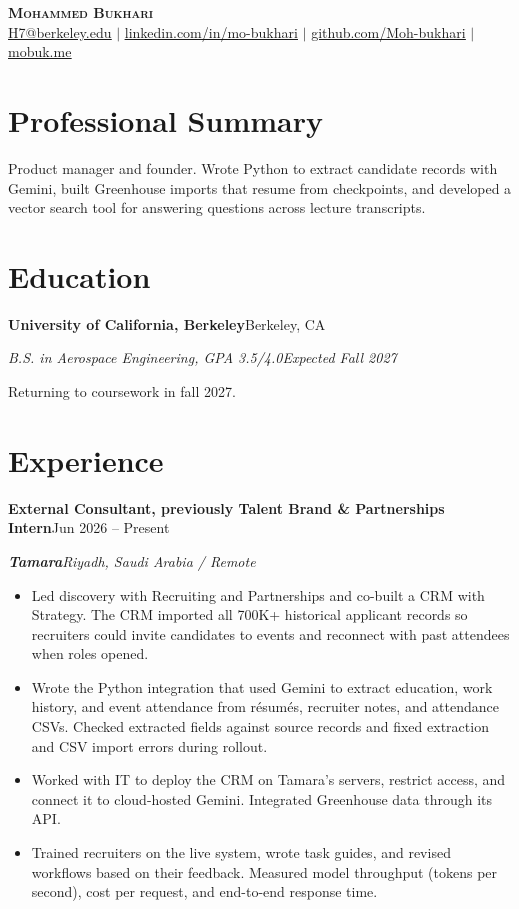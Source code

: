 \documentclass[a4paper,10pt]{article}
\newcommand{\resumeSubheading}[4]{\par\addvspace{3pt}\textbf{#1}\hfill #2\par\textit{#3}\hfill\textit{#4}\par}
\begin{document}
\begin{center}
{\LARGE{}\bfseries\scshape Mohammed Bukhari}\\[3pt]
\small
\href{mailto:H7@berkeley.edu}{\underline{H7@berkeley.edu}} $|$
\href{https://www.linkedin.com/in/mo-bukhari/}{\underline{linkedin.com/in/mo-bukhari}} $|$
\href{https://github.com/Moh-bukhari}{\underline{github.com/Moh-bukhari}} $|$
\href{https://mobuk.me}{\underline{mobuk.me}}
\end{center}

\section*{Professional Summary}
Product manager and founder. Wrote Python to extract candidate records with Gemini, built Greenhouse imports that resume from checkpoints, and developed a vector search tool for answering questions across lecture transcripts.

\section*{Education}
\resumeSubheading{University of California, Berkeley}{Berkeley, CA}
{B.S. in Aerospace Engineering, GPA 3.5/4.0}{Expected Fall 2027}
Returning to coursework in fall 2027.

\section*{Experience}
\resumeSubheading{External Consultant, previously Talent Brand \& Partnerships Intern}{Jun 2026 -- Present}
{\textbf{Tamara}}{Riyadh, Saudi Arabia / Remote}
\begin{itemize}
\item Led discovery with Recruiting and Partnerships and co-built a CRM with Strategy. The CRM imported all 700K+ historical applicant records so recruiters could invite candidates to events and reconnect with past attendees when roles opened.
\item Wrote the Python integration that used Gemini to extract education, work history, and event attendance from r\'esum\'es, recruiter notes, and attendance CSVs. Checked extracted fields against source records and fixed extraction and CSV import errors during rollout.
\item Worked with IT to deploy the CRM on Tamara's servers, restrict access, and connect it to cloud-hosted Gemini. Integrated Greenhouse data through its API.
\item Trained recruiters on the live system, wrote task guides, and revised workflows based on their feedback. Measured model throughput (tokens per second), cost per request, and end-to-end response time.
\end{itemize}
\end{document}
